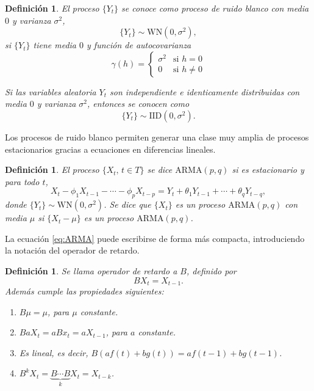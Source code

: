\documentclass[12pt,twoside]{article}
\newtheorem{definition}[theorem]{Definición}
\newcommand{\arma}{\text{ARMA}}
\newcommand{\wn}{\text{WN}(0, \sigma^2)}
\begin{document}
\begin{definition}\label{def:WN_process}
    El proceso $\{Y_t\}$ se conoce como proceso de ruido blanco con media $0$ y varianza $\sigma^2$,
    \begin{equation} \label{eq:WN_process}
        \{Y_t\} \sim \text{WN}(0, \sigma^2),
    \end{equation}
    si $\{Y_t\}$ tiene media $0$ y función de autocovarianza
    \begin{equation} \label{eq:WN_autocov}
        \gamma(h) = 
        \left\{ \begin{array}{ll} 
        \sigma^2 & \text{si } h=0 \\
        0 & \text{si } h \neq 0 
        \end{array} \right.
    \end{equation}

    Si las variables aleatoria $Y_t$ son independiente e identicamente distribuidas con media $0$ y varianza $\sigma^2$, entonces se conocen como
    \begin{equation} \label{eq:IDD_process}
        \{Y_t\} \sim \text{IID}(0, \sigma^2).
    \end{equation}
\end{definition}

Los procesos de ruido blanco permiten generar una clase muy amplia de procesos estacionarios gracias a ecuaciones en diferencias lineales.

\begin{definition}\label{def:ARMA}
    El proceso $\{X_t, \,t\in T\}$ se dice $\arma(p,q)$ si es estacionario y para todo $t$, 
    \begin{equation}\label{eq:ARMA}
        X_t - \phi_1X_{t-1}-\dotsb-\phi_pX_{t-p} = Y_t +\theta_1Y_{t-1} + \dotsb + \theta_q Y_{t-q},
    \end{equation}
    donde $\{Y_t\}\sim \wn$. Se dice que $\{X_t\}$ es un proceso $\arma(p,q)$ con media $\mu$ si $\{X_t - \mu\}$ es un proceso $\arma(p,q)$.
\end{definition}

La ecuación \eqref{eq:ARMA} puede escribirse de forma más compacta, introduciendo la notación del operador de retardo.

\begin{definition}\label{def:lag_operator}
    Se llama operador de retardo a $B$, definido por  
    \begin{equation}\label{eq:lag_operator}
    BX_t = X_{t-1}.
\end{equation}
Además cumple las propiedades siguientes:
\begin{enumerate}
    \item $B\mu = \mu$, para $\mu$ constante.
    \item $B a X_t = a B x_t = aX_{t-1}$, para $a$ constante.
    \item Es lineal, es decir, $B(af(t) + bg(t)) = af(t-1) + b g(t-1)$.
    \item $B^kX_t = \underbrace{B\cdots B}_k X_t = X_{t-k}$.
\end{enumerate}
\end{definition}
\end{document}
